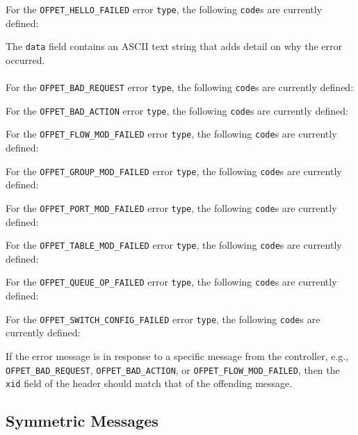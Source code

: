 
For the \verb|OFPET_HELLO_FAILED| error \verb|type|, the following \verb|code|s are currently defined:


The \verb|data| field contains an ASCII text string that adds detail on why the error occurred.
\\\\
For the \verb|OFPET_BAD_REQUEST| error \verb|type|, the following \verb|code|s are currently defined:



For the \verb|OFPET_BAD_ACTION| error \verb|type|, the following \verb|code|s are currently defined:



For the \verb|OFPET_FLOW_MOD_FAILED| error \verb|type|, the following \verb|code|s are currently defined:



For the \verb|OFPET_GROUP_MOD_FAILED| error \verb|type|, the following \verb|code|s are currently defined:



For the \verb|OFPET_PORT_MOD_FAILED| error \verb|type|, the following \verb|code|s are currently defined:



For the \verb|OFPET_TABLE_MOD_FAILED| error \verb|type|, the following \verb|code|s are currently defined:



For the \verb|OFPET_QUEUE_OP_FAILED| error \verb|type|, the following \verb|code|s are currently defined:



For the \verb|OFPET_SWITCH_CONFIG_FAILED| error \verb|type|, the following \verb|code|s are currently defined:



If the error message is in response to a specific message from the controller, e.g., \verb|OFPET_BAD_REQUEST|, \verb|OFPET_BAD_ACTION|, or \verb|OFPET_FLOW_MOD_FAILED|, then the \verb|xid| field of the header should match that of the offending message.

\subsection{Symmetric Messages}
